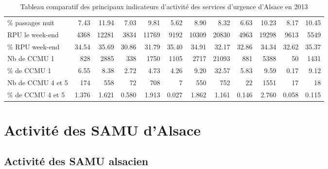 \documentclass[12pt,english,french,twoside]{book}\usepackage[]{graphicx}\usepackage[]{color}
\begin{document}
\begin{landscape}
\begin{table}[ht]
\begin{tabular}{lrrrrrrrrrrr}
  \% passages nuit &  7.43 & 11.94 &  7.03 &  9.81 &  5.62 &  8.90 &  8.32 &  6.63 & 10.23 &  8.17 & 10.45 \\ 
  RPU le week-end &  4368 & 12281 &  3834 & 11769 &  9192 & 10309 & 20830 &  4963 & 19298 &  9613 &  5549 \\ 
  \% RPU week-end & 34.54 & 35.69 & 30.86 & 31.79 & 35.40 & 34.91 & 32.17 & 32.86 & 34.34 & 32.62 & 35.37 \\ 
  Nb de CCMU 1 &   828 &  2885 &   338 &  1750 &  1105 &  2717 & 21093 &   881 &  5388 &    50 &  1431 \\ 
  \% de CCMU 1 &  6.55 &  8.38 &  2.72 &  4.73 &  4.26 &  9.20 & 32.57 &  5.83 &  9.59 &  0.17 &  9.12 \\ 
  Nb de CCMU 4 et 5 &  174 &  558 &   72 &  708 &    7 &  550 &  752 &   22 & 1551 &   17 &   18 \\ 
  \% de CCMU 4 et 5 & 1.376 & 1.621 & 0.580 & 1.913 & 0.027 & 1.862 & 1.161 & 0.146 & 2.760 & 0.058 & 0.115 \\ 
   \hline
\end{tabular}
\caption[Tableu de synthèse des SU]{Tableau comparatif des principaux indicateurs d'activité des services d'urgence d'Alsace en 2013} 
\label{tab:synthèse}
\end{table}


\end{landscape}





\part{Activité des SAMU d'Alsace}







\chapter{Activité des SAMU alsacien}
\end{document}
